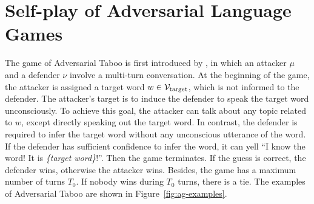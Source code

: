 \documentclass{article}
\theoremstyle{plain}
\theoremstyle{definition}
\theoremstyle{remark}
\begin{document}









\vspace{-2mm}
\section{Self-play of Adversarial Language Games} \label{sec:SPAG-method}
\vspace{-2mm}


The game of Adversarial Taboo is first introduced by \citet{yao2021adversarial}, in which an attacker $\mu$ and a defender $\nu$ involve a multi-turn conversation. At the beginning of the game, the attacker is assigned a target word $w \in {\mathcal{V}}_\text{target}$, which is not informed to the defender. The attacker's target is to induce the defender to speak the target word unconsciously. To achieve this goal, the attacker can talk about any topic related to $w$, except directly speaking out the target word. In contrast, the defender is required to infer the target word without any unconscious utterance of the word. If the defender has sufficient confidence to infer the word, 
it can yell ``I know the word! It is \textit{\{target word\}}!''. Then the game terminates. If the guess is correct, the defender wins, otherwise 
the attacker wins. Besides, the game has a maximum number of turns $T_0$. If nobody wins during $T_0$ turns, there is a tie. The examples of Adversarial Taboo are shown in Figure~\ref{fig:ag-examples}.
\end{document}

